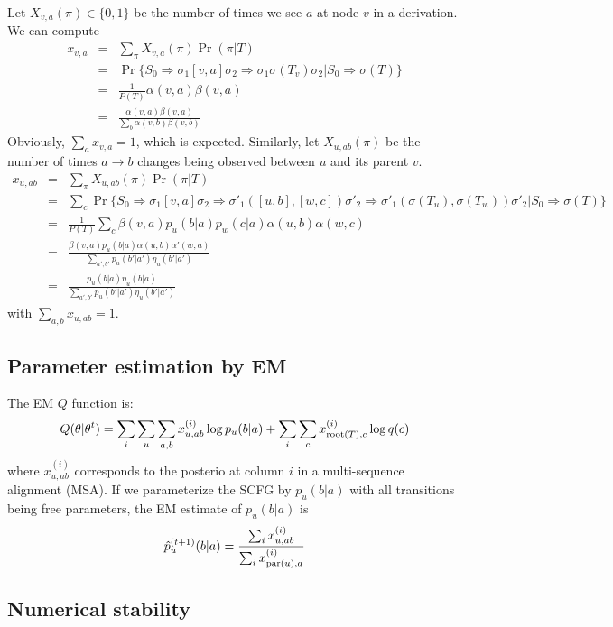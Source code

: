 \documentclass[10pt]{article}
\begin{document}
Let $X_{v,a}(\pi)\in\{0,1\}$ be the number of times we see $a$ at node $v$ in a
derivation. We can compute
\begin{eqnarray*}
x_{v,a}&=&\sum_{\pi}X_{v,a}(\pi)\Pr(\pi|T)\\
&=&\Pr\{S_0\Rightarrow\sigma_1[v,a]\sigma_2\Rightarrow\sigma_1\sigma(T_v)\sigma_2|S_0\Rightarrow\sigma(T)\}\\
&=&\frac{1}{P(T)}\alpha(v,a)\beta(v,a)\\
&=&\frac{\alpha(v,a)\beta(v,a)}{\sum_b\alpha(v,b)\beta(v,b)}
\end{eqnarray*}
Obviously, $\sum_a x_{v,a}=1$, which is expected. Similarly, let
$X_{u,ab}(\pi)$ be the number of times $a\to b$ changes being observed between
$u$ and its parent $v$.
\begin{eqnarray*}
x_{u,ab}
&=&\sum_{\pi}X_{u,ab}(\pi)\Pr(\pi|T)\\
&=&\sum_c\Pr\{S_0\Rightarrow\sigma_1[v,a]\sigma_2\Rightarrow\sigma'_1([u,b],[w,c])\sigma'_2\Rightarrow\sigma'_1(\sigma(T_u),\sigma(T_w))\sigma'_2|S_0\Rightarrow\sigma(T)\}\\
&=&\frac{1}{P(T)}\sum_c\beta(v,a)p_u(b|a)p_w(c|a)\alpha(u,b)\alpha(w,c)\\
&=&\frac{\beta(v,a)p_u(b|a)\alpha(u,b)\alpha'(w,a)}{\sum_{a',b'}p_u(b'|a')\eta_u(b'|a')}\\
&=&\frac{p_u(b|a)\eta_u(b|a)}{\sum_{a',b'}p_u(b'|a')\eta_u(b'|a')}
\end{eqnarray*}
with $\sum_{a,b}x_{u,ab}=1$.

\subsection{Parameter estimation by EM}

The EM $Q$ function is:
$$
Q(\theta|\theta^t)=\sum_i\sum_u\sum_{a,b}x^{(i)}_{u,ab}\log p_u(b|a)+\sum_i\sum_c x^{(i)}_{{\rm root}(T),c}\log q(c)
$$
where $x^{(i)}_{u,ab}$ corresponds to the posterio at column $i$ in a multi-sequence alignment (MSA).
If we parameterize the SCFG by $p_u(b|a)$ with all transitions being free parameters,
the EM estimate of $p_u(b|a)$ is
$$
\hat{p}^{(t+1)}_u(b|a) = \frac{\sum_i x^{(i)}_{u,ab}}{\sum_i x^{(i)}_{{\rm par}(u),a}}
$$

\subsection{Numerical stability}
\end{document}
